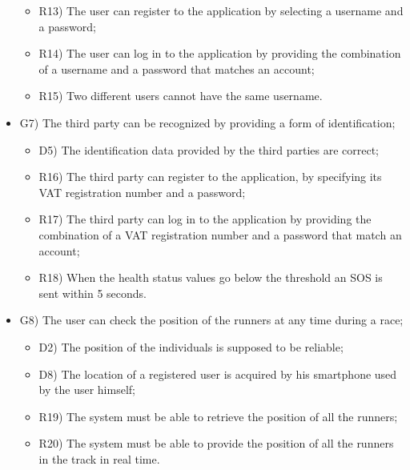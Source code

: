 \documentclass{article}
\begin{document}
\begin{legal}
\begin{legal}
\begin{legal}
\begin{itemize}
{\begin{itemize}
					\item R13) The user can register to the application by selecting a username and a password;\\
					\item R14) The user can log in to the application by providing the combination of a username and a password that matches an account;\\
					\item R15) Two different users cannot have the same username.\\
					\end{itemize}
				}
				\item G7) The third party can be recognized by providing a form of identification; \\
				{\normalfont
					\begin{itemize}
					\item D5) The identification data provided by the third parties are correct;\\
	 				\item R16) The third party can register to the application, by specifying its VAT registration number and a password;\\
					\item R17) The third party can log in to the application by providing the combination of a VAT registration number and a password that match an account;\\
					\item R18) When the health status values go below the threshold an SOS is sent within 5 seconds.\\
					\end{itemize}
				}
				\item G8) The user can check the position of the runners at any time during a race;\\
				{\normalfont
					\begin{itemize}
					\item D2) The position of the individuals is supposed to be reliable;\\
					\item D8) The location of a registered user is acquired by his smartphone used by the user himself;\\
	 				\item R19) The system must be able to retrieve the position of all the runners;\\
					\item R20) The system must be able to provide the position of all the runners in the track in real time.\\

\end{itemize}}
\end{itemize}
\end{legal}
\end{legal}
\end{legal}
\end{document}
